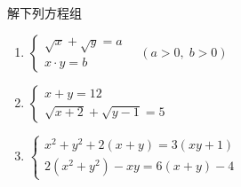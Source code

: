 \begin{ex}
解下列方程组
\begin{enumerate}
    \item $\begin{cases}
        \sqrt{x}+\sqrt{y}=a\\
        x\cdot y=b
    \end{cases}\quad (a>0,\; b>0)$
    \item $\begin{cases}
        x+y=12\\ \sqrt{x+2}+\sqrt{y-1}=5
    \end{cases}$
    \item $\begin{cases}
        x^2+y^2+2(x+y)=3(xy+1)\\
        2(x^2+y^2)-xy=6(x+y)-4
    \end{cases}$
\end{enumerate}
\end{ex}

